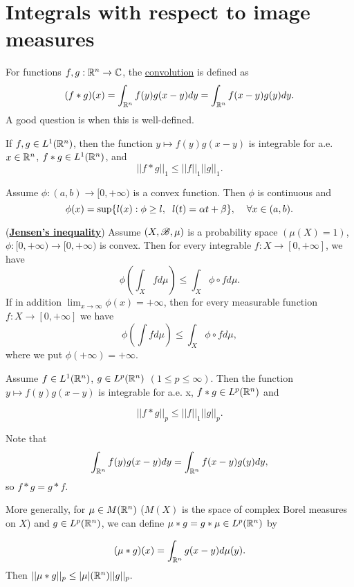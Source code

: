 \section{Integrals with respect to image measures}


\begin{definition}
    For functions $f,g:\mathbb{R}^n\rightarrow \mathbb{C}$, the \underline{convolution} is defined as \[(f*g)(x)= \int_{\mathbb{R}^n}f(y)g(x-y)dy = \int_{\mathbb{R}^n}f(x-y)g(y)dy.\]
    A good question is when this is well-defined. 
\end{definition}

\begin{lemma}
    If $f,g\in L^1(\mathbb{R}^n)$, then the function $y\mapsto f(y)g(x-y)$ is integrable for a.e. $x\in \mathbb{R}^n$, $f*g\in L^1(\mathbb{R}^n)$, and \[||f*g||_1\leq ||f||_1||g||_1.\]
\end{lemma}



\begin{lemma}
    Assume $\phi:(a,b)\rightarrow [0,+\infty)$ is a convex function. Then $\phi$ is continuous and \[\phi(x)=\sup\{l(x):\phi\geq l,\hspace{2mm} l(t)=\alpha t+\beta\},\hspace{4mm}\forall x\in (a,b).\]
\end{lemma}
\begin{theorem}(\underline{\textbf{Jensen's inequality}})
    Assume $(X,\mathscr{B},\mu)$ is a probability space $(\mu(X)=1)$, $\phi:[0,+\infty)\rightarrow [0,+\infty)$ is convex. Then for every integrable $f:X\rightarrow [0,+\infty]$, we have \[\phi\left(\int_X fd\mu\right)\leq \int_X \phi\circ fd\mu.\]
    If in addition $\lim_{x\rightarrow \infty }\phi(x)=+\infty$, then for every measurable function $f:X\rightarrow [0,+\infty]$ we have \[\phi\left(\int fd\mu\right)\leq \int_X \phi\circ fd\mu,\]
    where we put $\phi(+\infty)=+\infty$.
\end{theorem}



\begin{lemma}
    Assume $f\in L^1(\mathbb{R}^n)$, $g\in L^p(\mathbb{R}^n)$ $(1\leq p\leq \infty)$. Then the 
    function $y\mapsto f(y)g(x-y)$ is integrable for a.e. x, $f*g\in L^p (\mathbb{R}^n)$ and 
    
    \[||f*g||_p\leq ||f||_1||g||_p.\]
\end{lemma}
Note that 
\[\int _{\mathbb{R}^n} f(y)g(x-y)dy = \int_{\mathbb{R}^n}f(x-y)g(y)dy,\]
so $f*g = g*f$.
\begin{remark}
    More generally, for $\mu\in M(\mathbb{R}^n)$ ($M(X)$ is the space of complex Borel measures on $X$) and $g\in L^p(\mathbb{R}^n)$, we can define $\mu *g=g*\mu\in L^p(\mathbb{R}^n)$ by 
    
    \[(\mu*g)(x) = \int_{\mathbb{R}^n}g(x-y)d\mu(y).\]
    Then $||\mu*g||_p\leq |\mu|(\mathbb{R}^n)||g||_p.$
\end{remark}


